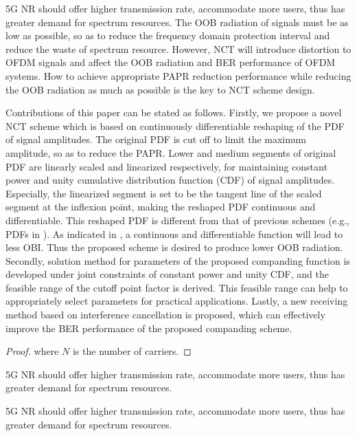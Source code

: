 \documentclass{ccjnl}
\begin{document}
5G NR should offer higher transmission rate, accommodate more users, thus has greater demand for spectrum resources. The OOB radiation of signals must be as low as possible, so as to reduce the frequency domain protection interval and reduce the waste of spectrum resource. However, NCT will introduce distortion to OFDM signals and affect the OOB radiation and BER performance of OFDM systems. How to achieve appropriate PAPR reduction performance while reducing the OOB radiation as much as possible is the key to NCT scheme design.

Contributions of this paper can be stated as follows. Firstly, we propose a novel NCT scheme which is based on continuously differentiable reshaping of the PDF of signal amplitudes. The original PDF is cut off to limit the maximum amplitude, so as to reduce the PAPR. Lower and medium segments of original PDF are linearly scaled and linearized respectively, for maintaining constant power and unity cumulative distribution function (CDF) of signal amplitudes. Especially, the linearized segment is set to be the tangent line of the scaled segment at the inflexion point, making the reshaped PDF continuous and differentiable. This reshaped PDF is different from that of previous schemes (e.g., PDFs in \cite{17,18,19,20,21,22,23}). As indicated in \cite{24}, a continuous and differentiable function will lead to less OBI. Thus the proposed scheme is desired to produce lower OOB radiation. Secondly, solution method for parameters of the proposed companding function is developed under joint constraints of constant power and unity CDF, and the feasible range of the cutoff point factor is derived. This feasible range can help to appropriately select parameters for practical applications. Lastly, a new receiving method based on interference cancellation is proposed, which can effectively improve the BER performance of the proposed companding scheme.

\begin{proof}
\label{proof1}
where $N$ is the number of carriers. 
\end{proof}

\begin{theorem}
\label{theorem1}
5G NR should offer higher transmission rate, accommodate more users, thus has greater demand for spectrum resources.
\end{theorem}

\begin{definition}
\label{definition1}
5G NR should offer higher transmission rate, accommodate more users, thus has greater demand for spectrum resources.
\end{definition}
\end{document}
